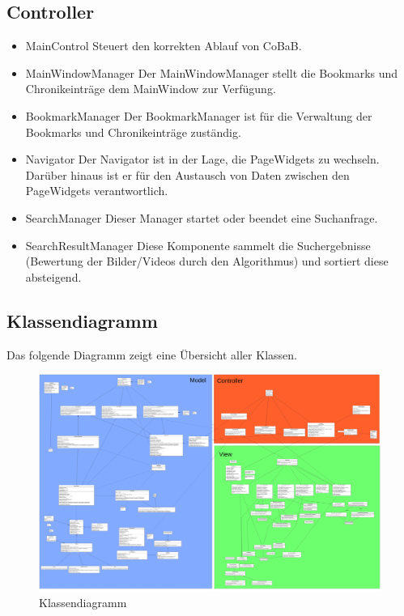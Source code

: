 \subsection*{Controller}
\begin{itemize}
\item MainControl \newline
Steuert den korrekten Ablauf von CoBaB.

\item MainWindowManager \newline
Der MainWindowManager stellt die Bookmarks und Chronikeinträge dem MainWindow zur Verfügung.

\item BookmarkManager \newline
Der BookmarkManager ist für die Verwaltung der Bookmarks und Chronikeinträge zuständig.

\item Navigator \newline
Der Navigator ist in der Lage, die PageWidgets zu wechseln. Darüber hinaus ist er für den Austausch von Daten zwischen den PageWidgets verantwortlich.

\item SearchManager \newline
Dieser Manager startet oder beendet eine Suchanfrage.

\item SearchResultManager \newline
Diese Komponente sammelt die Suchergebnisse (Bewertung der Bilder/Videos durch den Algorithmus) und sortiert diese absteigend.
\end{itemize}
\pagebreak


\subsection{Klassendiagramm}

Das folgende Diagramm zeigt eine Übersicht aller Klassen.

\begin{figure}[H]
	\includegraphics[width=1\linewidth]{img/Klassendiagramm/Complete}
	\caption{Klassendiagramm}
	\label{fig:klassendiagramm}
\end{figure}

